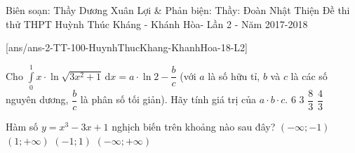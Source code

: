 \begin{name}
{Biên soạn: Thầy Dương Xuân Lợi \& Phản biện: Thầy: Đoàn Nhật Thiện }
{Đề thi thử THPT Huỳnh Thúc Kháng - Khánh Hòa- Lần 2 - Năm 2017-2018}
\end{name}
\setcounter{ex}{0}\setcounter{bt}{0}
[ans/ans-2-TT-100-HuynhThucKhang-KhanhHoa-18-L2]
\begin{ex}%
	Cho $\displaystyle\int \limits_0^1{x\cdot \ln \sqrt{3x^2+1}}\mathrm{\,d}x=a\cdot \ln {2}-\dfrac{b}{c}$ (với $a$ là số hữu tỉ, $b$ và $c$ là các số nguyên dương, $\dfrac{b}{c}$ là phân số tối giản). Hãy tính giá trị của $a\cdot b\cdot c$.
	\choice
	{$6$}
	{$3$}
	{\True $\dfrac{8}{3}$}
	{$\dfrac{4}{3}$}
\end{ex}

\begin{ex}%
	Hàm số $y=x^3-3x+1$ nghịch biến trên khoảng nào sau đây?
	\choice
	{$\left(-\infty ;-1 \right)$}
	{$\left(1;+\infty \right)$}
	{\True $\left(-1 ;1 \right)$}
	{$\left( -\infty ;+\infty \right)$}
\end{ex}


